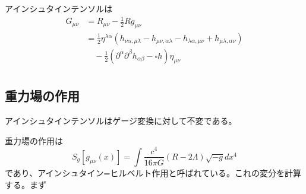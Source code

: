     アインシュタインテンソルは
    \begin{align*}
        G_{\mu\nu}
            &= R_{\mu\nu} - \frac{1}{2}Rg_{\mu\nu}\\
            &= \frac{1}{2}\eta^{\lambda\alpha}(h_{\nu\alpha, \mu\lambda} - h_{\mu\nu, \alpha\lambda} - h_{\lambda\alpha, \mu\nu} + h_{\mu\lambda, \alpha\nu})\\
                &\quad - \frac{1}{2}(\partial^\alpha \partial^\beta h_{\alpha\beta} - \square h)\eta_{\mu\nu}\\
    \end{align*}

\subsection{重力場の作用}
    アインシュタインテンソルはゲージ変換に対して不変である。

    重力場の作用は
        \[S_g[g_{\mu\nu}(x)] = \int \frac{c^4}{16\pi G}(R - 2\Lambda) \sqrt{-g}dx^4\]
    であり、アインシュタイン=ヒルベルト作用と呼ばれている。これの変分を計算する。まず
        

